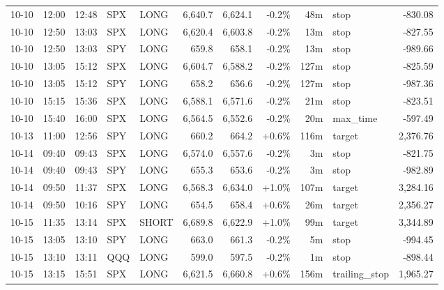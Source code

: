 \documentclass[11pt,a4paper,twoside]{article}
\begin{document}
\begin{center}
\begin{longtable}{>{\color{txtmain}}l l l l l r r r r >{\color{txtmain}}l r}
10-10 & 12:00 & 12:48 & SPX & LONG & 6,640.7 & 6,624.1 & \textcolor{lossred}{-0.2\%} & 48m & stop & \textcolor{lossred}{-830.08} \\
10-10 & 12:50 & 13:03 & SPX & LONG & 6,620.4 & 6,603.8 & \textcolor{lossred}{-0.2\%} & 13m & stop & \textcolor{lossred}{-827.55} \\
10-10 & 12:50 & 13:03 & SPY & LONG & 659.8 & 658.1 & \textcolor{lossred}{-0.2\%} & 13m & stop & \textcolor{lossred}{-989.66} \\
10-10 & 13:05 & 15:12 & SPX & LONG & 6,604.7 & 6,588.2 & \textcolor{lossred}{-0.2\%} & 127m & stop & \textcolor{lossred}{-825.59} \\
10-10 & 13:05 & 15:12 & SPY & LONG & 658.2 & 656.6 & \textcolor{lossred}{-0.2\%} & 127m & stop & \textcolor{lossred}{-987.36} \\
10-10 & 15:15 & 15:36 & SPX & LONG & 6,588.1 & 6,571.6 & \textcolor{lossred}{-0.2\%} & 21m & stop & \textcolor{lossred}{-823.51} \\
10-10 & 15:40 & 16:00 & SPX & LONG & 6,564.5 & 6,552.6 & \textcolor{lossred}{-0.2\%} & 20m & max\_time & \textcolor{lossred}{-597.49} \\
10-13 & 11:00 & 12:56 & SPY & LONG & 660.2 & 664.2 & \textcolor{wingreen}{+0.6\%} & 116m & target & \textcolor{wingreen}{2,376.76} \\
10-14 & 09:40 & 09:43 & SPX & LONG & 6,574.0 & 6,557.6 & \textcolor{lossred}{-0.2\%} & 3m & stop & \textcolor{lossred}{-821.75} \\
10-14 & 09:40 & 09:43 & SPY & LONG & 655.3 & 653.6 & \textcolor{lossred}{-0.2\%} & 3m & stop & \textcolor{lossred}{-982.89} \\
10-14 & 09:50 & 11:37 & SPX & LONG & 6,568.3 & 6,634.0 & \textcolor{wingreen}{+1.0\%} & 107m & target & \textcolor{wingreen}{3,284.16} \\
10-14 & 09:50 & 10:16 & SPY & LONG & 654.5 & 658.4 & \textcolor{wingreen}{+0.6\%} & 26m & target & \textcolor{wingreen}{2,356.27} \\
10-15 & 11:35 & 13:14 & SPX & SHORT & 6,689.8 & 6,622.9 & \textcolor{wingreen}{+1.0\%} & 99m & target & \textcolor{wingreen}{3,344.89} \\
10-15 & 13:05 & 13:10 & SPY & LONG & 663.0 & 661.3 & \textcolor{lossred}{-0.2\%} & 5m & stop & \textcolor{lossred}{-994.45} \\
10-15 & 13:10 & 13:11 & QQQ & LONG & 599.0 & 597.5 & \textcolor{lossred}{-0.2\%} & 1m & stop & \textcolor{lossred}{-898.44} \\
10-15 & 13:15 & 15:51 & SPX & LONG & 6,621.5 & 6,660.8 & \textcolor{wingreen}{+0.6\%} & 156m & trailing\_stop & \textcolor{wingreen}{1,965.27} \\

\end{longtable}
\end{center}
\end{document}
